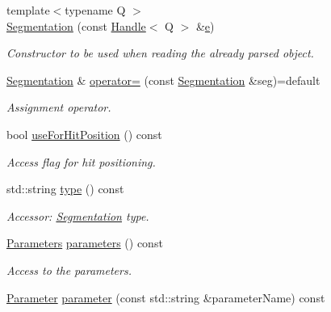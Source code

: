 \begin{DoxyCompactItemize}
{\footnotesize template$<$typename Q $>$ }\\\hyperlink{class_d_d4hep_1_1_geometry_1_1_segmentation_a03114abcb0002cc53096277890cd1e6e}{Segmentation} (const \hyperlink{class_d_d4hep_1_1_handle}{Handle}$<$ Q $>$ \&\hyperlink{_volumes_8cpp_a8a9a1f93e9b09afccaec215310e64142}{e})
\begin{DoxyCompactList}\small\item\em Constructor to be used when reading the already parsed object. \end{DoxyCompactList}\item 
\hyperlink{class_d_d4hep_1_1_geometry_1_1_segmentation}{Segmentation} \& \hyperlink{class_d_d4hep_1_1_geometry_1_1_segmentation_aacce6e3180ed687609273b30eaf19723}{operator=} (const \hyperlink{class_d_d4hep_1_1_geometry_1_1_segmentation}{Segmentation} \&seg)=default
\begin{DoxyCompactList}\small\item\em Assignment operator. \end{DoxyCompactList}\item 
bool \hyperlink{class_d_d4hep_1_1_geometry_1_1_segmentation_a0f6595fe0d070d625472daa606cb50ba}{use\+For\+Hit\+Position} () const
\begin{DoxyCompactList}\small\item\em Access flag for hit positioning. \end{DoxyCompactList}\item 
std\+::string \hyperlink{class_d_d4hep_1_1_geometry_1_1_segmentation_ad7ddeca9128936f2d36618f9342b13fe}{type} () const
\begin{DoxyCompactList}\small\item\em Accessor\+: \hyperlink{class_d_d4hep_1_1_geometry_1_1_segmentation}{Segmentation} type. \end{DoxyCompactList}\item 
\hyperlink{class_d_d4hep_1_1_geometry_1_1_segmentation_af7d9af7b574fa9039f44befc61b7e46f}{Parameters} \hyperlink{class_d_d4hep_1_1_geometry_1_1_segmentation_a6163224b6fd21e69af1414cdd747d40a}{parameters} () const
\begin{DoxyCompactList}\small\item\em Access to the parameters. \end{DoxyCompactList}\item 
\hyperlink{class_d_d4hep_1_1_geometry_1_1_segmentation_a179c843c1bc64eabb85be55e2538be19}{Parameter} \hyperlink{class_d_d4hep_1_1_geometry_1_1_segmentation_a6a29d01c01a7f2a1717662800afd1245}{parameter} (const std\+::string \&parameter\+Name) const

\end{DoxyCompactItemize}
